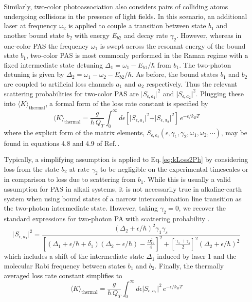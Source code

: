 Similarly, two-color photoassociation also considers pairs of colliding atoms undergoing collisions in the presence of light fields.
In this scenario, an additional laser at frequency $\omega_2$ is applied to couple a transition between state $b_1$ and another bound state $b_2$ with energy $E_{b2}$ and decay rate $\gamma_2$.
However, whereas in one-color PAS the frequency $\omega_1$ is swept across the resonant energy of the bound state $b_1$, two-color PAS is most commonly performed in the Raman regime with a fixed intermediate state detuning $\Delta_1 = \omega_1 - E_{b1}/\hbar$ from $b_1$.
The two-photon detuning is given by $\Delta_2 = \omega_1 - \omega_2 - E_{b2}/\hbar$.
As before, the bound states $b_1$ and $b_2$ are coupled to artificial loss channels $a_1$ and $a_2$ respectively.
Thus the relevant scattering probabilities for two-color PAS are $\vert S_{\epsilon, a_1} \vert^2$ and $\vert S_{\epsilon, a_2} \vert^2$.
Plugging these into $\langle K \rangle_\text{thermal}$, a formal form of the loss rate constant is specified by
\begin{equation} \label{eq:kLoss2Ph}
  \langle K \rangle_\text{thermal} = \frac{g}{h\,Q_{T}} \int_{0}^{\infty} d\epsilon \left[ \vert S_{\epsilon, a_1} \vert^2 + \vert S_{\epsilon, a_2} \vert^2 \right] \,e^{-\epsilon/k_{B}T}
\end{equation}
where the explicit form of the matrix elements, $S_{\epsilon, a_i}(\epsilon,\gamma_1,\gamma_2,\omega_1,\omega_2,\cdots)$, may be found in equations 4.8 and 4.9 of Ref.\,\cite{Bohn1999}.

Typically, a simplifying assumption is applied to Eq.\,\ref{eq:kLoss2Ph} by considering loss from the state $b_2$ at rate $\gamma_2$ to be negligible on the experimental timescales or in comparison to loss due to scattering from $b_1$.
While this is usually a valid assumption for PAS in alkali systems, it is not necessarily true in alkaline-earth system when using bound states of a narrow intercombination line transition as the two-photon intermediate state.
However, taking $\gamma_2=0$, we recover the standard expressions for two-photon PA with scattering probability \cite{MartinezDeEscobar2008,Jones2006,Napolitano1994,Pachomov2017}.
\begin{equation} \label{eq:twoPhotonSe1}
	\vert  S_{\epsilon, a_1} \vert^2 = \frac{(\Delta_2 + \epsilon/\hbar)^2 \gamma_1 \gamma_s}{
  	\left[ (\Delta_1+\epsilon/\hbar+\delta_1) (\Delta_2+\epsilon/\hbar)-\frac{\Omega_{12}^{2}}{4}\right]^2 + \left[ \frac{\gamma_1 + \gamma_s}{2}\right]^2 (\Delta_2+\epsilon/\hbar)^2}
\end{equation}
which includes a shift of the intermediate state $\Delta_1$ induced by laser 1 and the molecular Rabi frequency between states $b_1$ and $b_2$.
Finally, the thermally averaged loss rate constant simplifies to
\begin{equation} \label{eq:twoPhotonKavg}
	\langle K \rangle_\text{thermal}  = \frac{g}{h\,Q_{T}} \int_{0}^{\infty} d\epsilon \vert  S_{\epsilon, a_1} \vert^2 \,e^{-\epsilon/k_{B}T}
\end{equation}

